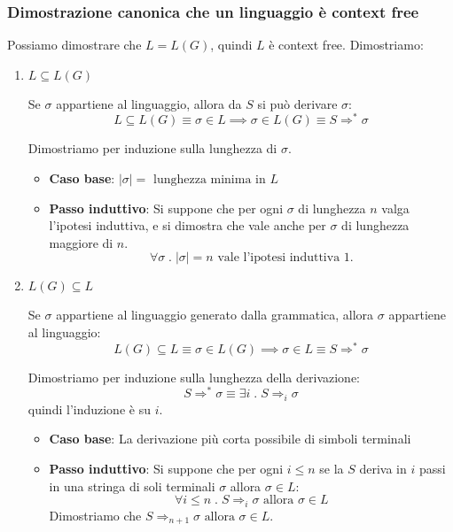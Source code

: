 \documentclass[a4paper]{article}
\begin{document}
\subsubsection{Dimostrazione canonica che un linguaggio è context free}
\begin{definition}
  Possiamo dimostrare che \( L = L(G) \), quindi \( L \) è context free. Dimostriamo:
  \begin{enumerate}
    \item \( L \subseteq L(G) \)

      \vspace{1em}
      \noindent
      Se \( \sigma  \) appartiene al linguaggio, allora da \( S \) si può derivare \( \sigma \):
      \[
        L \subseteq L(G) \equiv \sigma \in L \implies \sigma \in L(G) \equiv S \Rightarrow^* \sigma
      \] 

      \vspace{1em}
      \noindent
      Dimostriamo per induzione sulla lunghezza di \( \sigma  \).
      \begin{itemize}
        \item \textbf{Caso base}: \( |\sigma| = \text{ lunghezza minima in } L \)
        \item \textbf{Passo induttivo}: Si suppone che per ogni \( \sigma  \) di lunghezza
          \( n \) valga l'ipotesi induttiva, e si dimostra che vale anche per
          \( \sigma  \) di lunghezza maggiore di \( n \).
          \[
            \forall \sigma  \;.\; |\sigma| = n \text{ vale l'ipotesi induttiva 1.}
          \] 
      \end{itemize}
    \item \( L(G) \subseteq L \) 

      \vspace{1em}
      \noindent
      Se \( \sigma \) appartiene al linguaggio generato dalla grammatica, allora \( \sigma \)
      appartiene al linguaggio:
      \[
        L(G) \subseteq L \equiv \sigma \in L(G) \implies \sigma \in L \equiv S \Rightarrow^* \sigma
      \] 

      \vspace{1em}
      \noindent
      Dimostriamo per induzione sulla lunghezza della derivazione:
      \[
        S \Rightarrow^* \sigma \equiv \exists i \;.\; S \Rightarrow_i \sigma
      \] 
      quindi l'induzione è su \( i \).
      \begin{itemize}
        \item \textbf{Caso base}: La derivazione più corta possibile di simboli terminali
        \item \textbf{Passo induttivo}: Si suppone che per ogni \( i \le n \) se
          la \( S \) deriva in \( i \) passi in una stringa di soli terminali \( \sigma  \) 
          allora \( \sigma  \in L \):
          \[
            \forall i \le n \;.\; S \Rightarrow_i \sigma \text{ allora } \sigma \in L
          \] 
          Dimostriamo che \( S \Rightarrow_{n+1} \sigma \text{ allora } \sigma \in L \).
      \end{itemize}
  \end{enumerate}
\end{definition}
\end{document}
